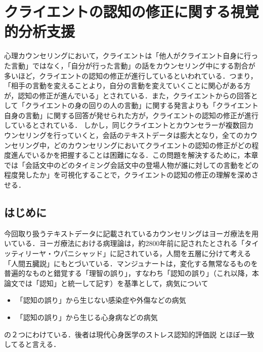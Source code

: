 \documentclass[shuuron]{kuee}
\begin{document}
\chapter{クライエントの認知の修正に関する視覚的分析支援}

心理カウンセリングにおいて，クライエントは「他人がクライエント自身に行った言動」ではなく，「自分が行った言動」の話をカウンセリング中にする割合が多いほど，クライエントの認知の修正が進行しているといわれている．つまり，「相手の言動を変えることより，自分の言動を変えていくことに関心がある方が，認知の修正が進んでいる」\cite{zokad}とされている．また，クライエントからの回答として「クライエントの身の回りの人の言動」に関する発言よりも「クライエント自身の言動」に関する回答が発せられた方が，クライエントの認知の修正が進行しているとされている．
しかし，同じクライエントとカウンセラーが複数回カウンセリングを行っていくと，会話のテキストデータは膨大となり，全てのカウンセリング中，どのカウンセリングにおいてクライエントの認知の修正がどの程度進んでいるかを把握することは困難になる．この問題を解決するために，本章では「会話文中のどのタイミング会話文中の登場人物が誰に対しての言動をどの程度発したか」を可視化することで，クライエントの認知の修正の理解を深めさせる．

\section{はじめに}

今回取り扱うテキストデータに記載されているカウンセリングはヨーガ療法を用いている．ヨーガ療法における病理論は，約2800年前に記されたとされる「タイッティリーヤ・ウパニシャッド」に記されている，人間を五層に分けて考える「人間五臓説」にもとづいている\cite{kimura}．マンジュナート\cite{manjunath}は，変化する無常なるものを普遍的なものと錯覚する「理智の誤り」，すなわち「認知の誤り」（これ以降，本論文では「認知」と統一して記す）を基準として，病気について
\begin{itemize}
  \item 「認知の誤り」から生じない感染症や外傷などの病気
  \item 「認知の誤り」から生じる心身病などの病気
\end{itemize}
の２つにわけている．後者は現代心身医学のストレス認知的評価説%
\cite{Lazarus}とほぼ一致してると言える\cite{Darshana}．
\end{document}
